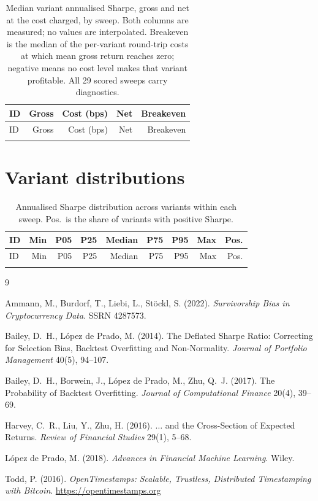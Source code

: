 \documentclass[11pt,a4paper]{article}
\begin{document}
\small
\begin{longtable}{lrrrr}
\caption{Median variant annualised Sharpe, gross and net at the cost charged,
by sweep. Both columns are measured; no values are interpolated. Breakeven is
the median of the per-variant round-trip costs at which mean gross return
reaches zero; negative means no cost level makes that variant profitable. All
29 scored sweeps carry diagnostics.\label{tab:cost}}\\
\toprule
ID & Gross & Cost (bps) & Net & Breakeven \\
\midrule
\endfirsthead
\toprule
ID & Gross & Cost (bps) & Net & Breakeven \\
\midrule
\endhead
\bottomrule
\endfoot

\end{longtable}
\normalsize

\section{Variant distributions}

\small
\begin{longtable}{lrrrrrrrr}
\caption{Annualised Sharpe distribution across variants within each sweep.
Pos.\ is the share of variants with positive Sharpe.}\\
\toprule
ID & Min & P05 & P25 & Median & P75 & P95 & Max & Pos. \\
\midrule
\endfirsthead
\toprule
ID & Min & P05 & P25 & Median & P75 & P95 & Max & Pos. \\
\midrule
\endhead
\bottomrule
\endfoot

\end{longtable}

\begin{thebibliography}{9}

Ammann, M., Burdorf, T., Liebi, L., St\"ockl, S. (2022).
\emph{Survivorship Bias in Cryptocurrency Data}. SSRN 4287573.

Bailey, D.~H., L\'opez de Prado, M. (2014).
The Deflated Sharpe Ratio: Correcting for Selection Bias, Backtest
Overfitting and Non-Normality.
\emph{Journal of Portfolio Management} 40(5), 94--107.

Bailey, D.~H., Borwein, J., L\'opez de Prado, M., Zhu, Q.~J. (2017).
The Probability of Backtest Overfitting.
\emph{Journal of Computational Finance} 20(4), 39--69.

Harvey, C.~R., Liu, Y., Zhu, H. (2016).
$\ldots$ and the Cross-Section of Expected Returns.
\emph{Review of Financial Studies} 29(1), 5--68.

L\'opez de Prado, M. (2018).
\emph{Advances in Financial Machine Learning}. Wiley.

Todd, P. (2016). \emph{OpenTimestamps: Scalable, Trustless, Distributed
Timestamping with Bitcoin}. \url{https://opentimestamps.org}

\end{thebibliography}
\end{document}

